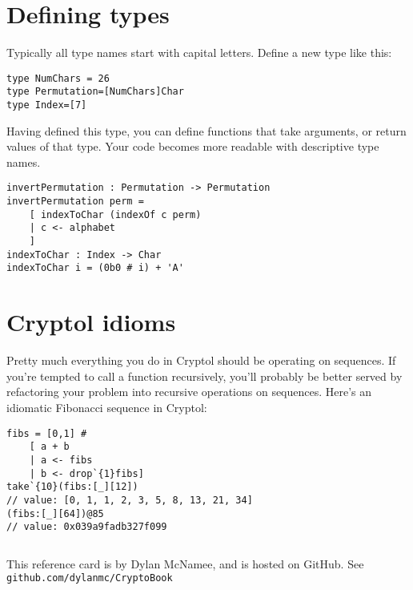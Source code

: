 \documentclass[9pt,letter]{article}
\begin{document}
\section{Defining types}
Typically all type names start with capital letters. Define a new type like this:
\begin{verbatim}
type NumChars = 26
type Permutation=[NumChars]Char
type Index=[7]
\end{verbatim}
Having defined this type, you can define functions that take arguments, or return values of that type. Your code becomes more readable with descriptive type names.
\begin{verbatim}
invertPermutation : Permutation -> Permutation
invertPermutation perm =
    [ indexToChar (indexOf c perm)
    | c <- alphabet
    ]
indexToChar : Index -> Char
indexToChar i = (0b0 # i) + 'A'
\end{verbatim}
\section{Cryptol idioms}
Pretty much everything you do in Cryptol should be operating on sequences.
If you're tempted to call a function recursively, you'll probably be better served by refactoring your problem into recursive operations on sequences. Here's an idiomatic Fibonacci sequence in Cryptol:
\begin{verbatim}
fibs = [0,1] #
    [ a + b
    | a <- fibs
    | b <- drop`{1}fibs]
take`{10}(fibs:[_][12])
// value: [0, 1, 1, 2, 3, 5, 8, 13, 21, 34]
(fibs:[_][64])@85
// value: 0x039a9fadb327f099
\end{verbatim}
\begin{verbatim}
\end{verbatim}

\baselineskip
This reference card is by Dylan McNamee,
and is hosted on GitHub. See \verb+github.com/dylanmc/CryptoBook+
\end{document}
